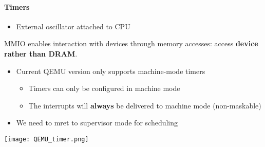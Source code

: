 \paragraph{Timers}
\begin{itemize}
    \item External oscillator attached to CPU
\end{itemize}

\newpar{}

MMIO enables interaction with devices through memory accesses: access \textbf{device rather than DRAM}.

\newpar{}

\begin{itemize}
    \item Current QEMU version only supports machine-mode timers
          \begin{itemize}
              \item Timers can only be configured in machine mode
              \item The interrupts will \textbf{always} be delivered to machine mode (non-maskable)
          \end{itemize}
    \item We need to mret to supervisor mode for scheduling
\end{itemize}
\begin{center}
    \texttt{[image: QEMU\_timer.png]}
\end{center}

